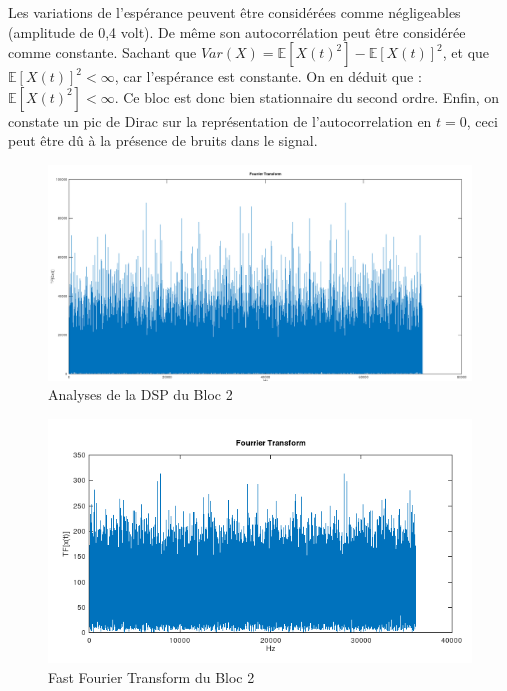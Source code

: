 \documentclass[french, a4paper, 12pt, openany]{book}
\begin{document}
	Les variations de l'espérance peuvent être considérées comme négligeables (amplitude de 0,4 volt). De même son autocorrélation peut être considérée comme constante.
	Sachant que \begin{math}Var(X) = \mathbb{E}[X(t)^2] - \mathbb{E}[X(t)]^2\end{math}, et que \begin{math}\mathbb{E}[X(t)]^2<\infty\end{math}, car l'espérance est constante. On en déduit que : \begin{math}\mathbb{E}[X(t)^2]<\infty\end{math}. Ce bloc est donc bien stationnaire du second ordre.
	Enfin, on constate un pic de Dirac sur la représentation de l'autocorrelation en \(t = 0\), ceci peut être dû à la présence de bruits dans le signal.

	\begin{figure}[ht]
		\begin{center}
		\includegraphics[scale=0.25]{images/DSPBloc2.png}
		\end{center}
		\caption{Analyses de la DSP du Bloc 2}
		\label{Analyses de la DSP du Bloc 2}
	\end{figure}

	\begin{figure}[ht]
		\begin{center}
		\includegraphics[scale=0.25]{images/TFBloc2.png}
		\end{center}
		\caption{Fast Fourier Transform du Bloc 2}
		\label{Fast Fourier Transform du Bloc 2}
	\end{figure}
\end{document}
